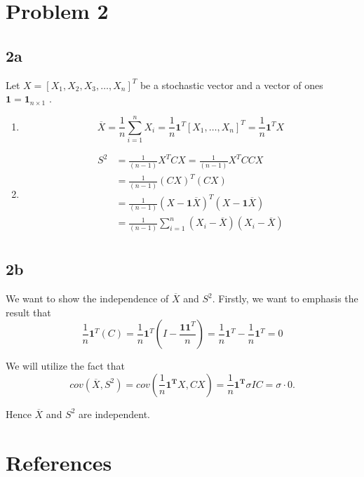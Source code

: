 \documentclass{article}
\theoremstyle{remark}
\begin{document}
\newpage
\section*{Problem 2}%
\label{sec:problem_2}

\subsection*{2a}%
\label{sub:2a}
Let  $ X= [ X_{1}, X_{2}, X_{3}, \ldots , X_{n} ]^{T}$ be a stochastic vector and a vector of ones $\mathbf{1} = \mathbf{1}_{n \times  1}$ .
\begin{enumerate}[label=(\roman*)]
    \item \[
\overline{X} = \frac{1}{n} \sum_{i=1}^{n}  X_{i} = \frac{1}{n}\mathbf{1}^{T}\left[ X_{1}, \ldots, X_{n}
        \right]^{T}  = \frac{1}{n}\mathbf{1}^{T}  X
    \]
\item  \[
\begin{split}
    S^{2} & = \frac{1}{\left( n-1 \right)} X^{T } CX  = \frac{1}{\left( n-1 \right)} X^{T} C C X \\
    &=  \frac{1}{\left( n-1 \right)} \left( CX \right)^{T} \left( CX \right) \\
    &=  \frac{1}{\left( n-1 \right)} \left( X- \mathbf{1} \overline{X}  \right)^{T} \left( X- \mathbf{1} \overline{X}  \right)\\
    &=  \frac{1}{\left( n-1 \right)} \sum_{i=1}^{n} \left( X_{i} - \overline{X}  \right)\left( X_{i} - \overline{X}  \right) \\
\end{split}
\]
\end{enumerate}



\subsection*{2b}%
\label{sub:2b}

We want to show the independence of $\overline{X} $  and $S^{2}$. Firstly,  we want to emphasis the result that \[
      \displaystyle  \frac{1}{n} \mathbf{1} ^{T} \left( C \right) = \frac{1}{n} \mathbf{1}^{T} \left( I -
        \frac{\mathbf{1}\mathbf{1}^{T}}{n} \right) = \frac{1}{n} \mathbf{1}^{T} - \frac{1}{n} \mathbf{1}^{T} = 0
\]

We will utilize the fact that \[
    cov\left( \overline{X} , S^{2} \right) = cov\left( \frac{1}{n} \mathbf{1^{T}} X, C X \right)  = \frac{1}{n}
    \mathbf{1^{T}} \sigma I C = \sigma \cdot 0.
\]

Hence $\overline{X} $ and $S^{2}$ are independent.






\newpage
\section{References}%
\label{sec:references}



\end{document}
